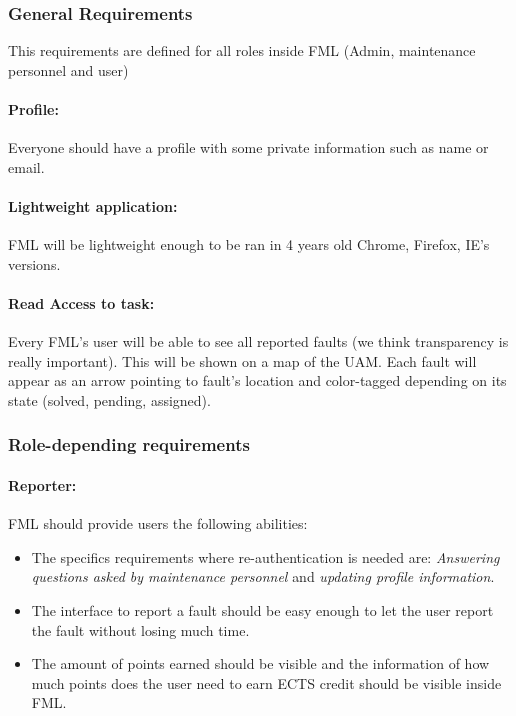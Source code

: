 \subsubsection{General Requirements}

This requirements are defined for all roles inside FML (Admin, maintenance personnel and user)

\paragraph{Profile: } Everyone should have a profile with some private information such as name or email.

\paragraph{Lightweight application: } 
FML will be lightweight enough to be ran in  4 years old Chrome, Firefox, IE's versions. 

\paragraph{Read Access to task: } Every FML's user will be able to see all reported faults (we think transparency is really important). This will be shown on a map of the UAM. Each fault will appear as an arrow pointing to fault's location and color-tagged depending on its state (solved, pending, assigned).

\subsubsection{Role-depending requirements}

\paragraph{Reporter: } FML should provide users the following abilities:
\begin{itemize}
\item The specifics requirements where re-authentication is needed are: \textit{Answering questions asked by maintenance personnel}   \label{Specifics_Secure_Requirements_for_user} and \textit{updating profile information}.
\item The interface to report a fault should be easy enough to let the user report the fault without losing much time.
\item The amount of points earned should be visible and the information of how much points does the user need to earn ECTS credit should be visible inside FML.

\end{itemize}

